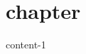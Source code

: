 \documentclass[12pt, a4paper]{article}
\begin{document}
    \section{{chapter}}

    {{content-1}}
\end{document}
